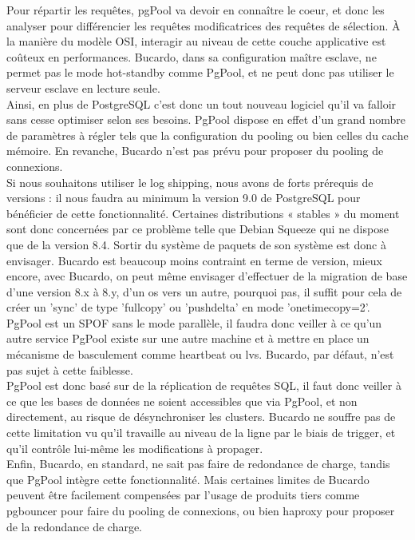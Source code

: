 \documentclass[12pt]{report}
\begin{document}
Pour répartir les requêtes, pgPool va devoir en connaître le coeur, et donc les
analyser pour différencier les requêtes modificatrices des requêtes de
sélection. À la manière du modèle OSI, interagir au niveau de cette couche
applicative est coûteux en performances. Bucardo, dans sa configuration maître
esclave, ne permet pas le mode hot-standby comme PgPool, et ne peut donc pas
utiliser le serveur esclave en lecture seule.\\

Ainsi, en plus de PostgreSQL c’est donc un tout nouveau logiciel qu’il va
falloir sans cesse optimiser selon ses besoins. PgPool dispose en effet d’un
grand nombre de paramètres à régler tels que la configuration du pooling ou bien
celles du cache mémoire. En revanche, Bucardo n'est pas prévu pour proposer du
pooling de connexions.\\

Si nous souhaitons utiliser le log shipping, nous avons de forts prérequis de
versions : il nous faudra au minimum la version 9.0 de PostgreSQL pour
bénéficier de cette fonctionnalité. Certaines distributions « stables » du
moment sont donc concernées par ce problème telle que Debian Squeeze qui ne
dispose que de la version 8.4. Sortir du système de paquets de son système est
donc à envisager. Bucardo est beaucoup moins contraint en terme de version,
mieux encore, avec Bucardo, on peut même envisager d'effectuer de la migration
de base d'une version 8.x à 8.y, d'un os vers un autre, pourquoi pas, il suffit
pour cela de créer un 'sync' de type 'fullcopy' ou 'pushdelta' en mode
'onetimecopy=2'.\\

PgPool est un SPOF sans le mode parallèle, il faudra donc veiller à ce qu'un
autre service PgPool existe sur une autre machine et à mettre en place un
mécanisme de basculement comme heartbeat ou lvs. Bucardo, par défaut, n'est pas
sujet à cette faiblesse.\\

PgPool est donc basé sur de la réplication de requêtes SQL, il faut donc veiller
à ce que les bases de données ne soient accessibles que via PgPool, et non
directement, au risque de désynchroniser les clusters. Bucardo ne souffre pas de
cette limitation vu qu'il travaille au niveau de la ligne par le biais de
trigger, et qu'il contrôle lui-même les modifications à propager.\\

Enfin, Bucardo, en standard, ne sait pas faire de redondance de charge, tandis
que PgPool intègre cette fonctionnalité. Mais certaines limites de Bucardo
peuvent être facilement compensées par l'usage de produits tiers comme pgbouncer
pour faire du pooling de connexions, ou bien haproxy pour proposer de la
redondance de charge.\\
\end{document}
